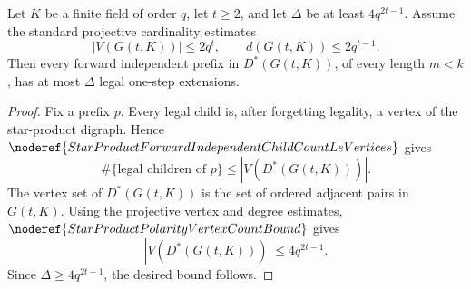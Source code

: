 \begin{helper}
Let \(K\) be a finite field of order \(q\), let \(t\ge2\), and let
\(\Delta\) be at least \(4q^{2t-1}\).  Assume the standard projective
cardinality estimates
\[
  |V(G(t,K))|\le 2q^t,\qquad d(G(t,K))\le2q^{t-1}.
\]
Then every forward independent prefix in \(D^*(G(t,K))\), of every length
\(m<k\), has at most \(\Delta\) legal one-step extensions.
\end{helper}
\begin{proof}
Fix a prefix \(p\).  Every legal child is, after forgetting legality, a
vertex of the star-product digraph.  Hence
\(\noderef{StarProductForwardIndependentChildCountLeVertices}\) gives
\[
  \#\{\text{legal children of }p\}\le |V(D^*(G(t,K)))|.
\]
The vertex set of \(D^*(G(t,K))\) is the set of ordered adjacent pairs in
\(G(t,K)\).  Using the projective vertex and degree estimates,
\(\noderef{StarProductPolarityVertexCountBound}\) gives
\[
  |V(D^*(G(t,K)))|\le 4q^{2t-1}.
\]
Since \(\Delta\ge4q^{2t-1}\), the desired bound follows.
\end{proof}

